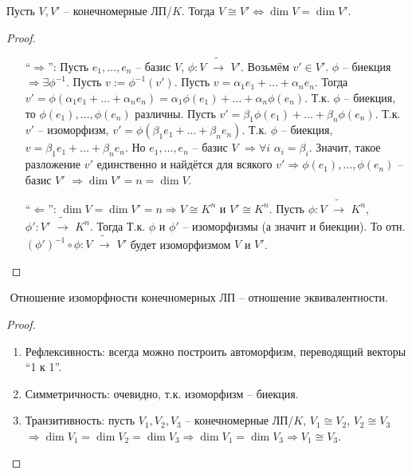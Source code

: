 \begin{theorem-nonna}
\end{theorem-nonna}
Пусть $V, V'$ -- конечномерные ЛП/$K$. Тогда $V \cong V'
\Leftrightarrow \dim V = \dim V'$.
\begin{proof} $ $

    \begin{itemize}
        \item[``$\Longrightarrow$'':] 
        Пусть $e_1, \dots, e_n$ -- базис $V$,
        $\phi : V \,\, \widetilde{\to} \,\, V'$.
        Возьмём $v' \in V'$. $\phi$ -- биекция $\Rightarrow
        \exists \phi^{-1}$. Пусть $v := \phi^{-1}(v')$.
        Пусть $v = \alpha_1 e_1 + \dots + \alpha_n e_n$.
        Тогда $v' = \phi(\alpha_1 e_1 + \dots + \alpha_n e_n) =
        \alpha_1 \phi(e_1) + \dots + \alpha_n \phi(e_n)$.
        Т.к. $\phi$ -- биекция, то $\phi(e_1), \dots, \phi(e_n)$
        различны. 
        Пусть $v' = \beta_1 \phi(e_1) + \dots + \beta_n \phi(e_n)$.
        Т.к. $v'$ -- изоморфизм, $v' = \phi(\beta_1 e_1 + 
        \dots + \beta_n e_n)$. Т.к. $\phi$ -- биекция,
        $v = \beta_1 e_1 + \dots + \beta_n e_n$.
        Но $e_1, \dots, e_n$ -- базис $V$
        $\Rightarrow \forall i \,\, \alpha_i = \beta_i$. Значит,
        такое разложение $v'$ единственно и найдётся для всякого
        $v' \Rightarrow \phi(e_1), \dots, \phi(e_n)$ -- базис $V'$
        $\Rightarrow \dim V' = n = \dim V$.

        \item[``$\Longleftarrow$'':]
        $\dim V = \dim V' = n \Rightarrow V \cong K^n$ и $V' \cong K^n$.
        Пусть $\phi : V \,\, \widetilde{\to} \,\, K^n$,
        $\phi' : V' \,\, \widetilde{\to} \,\, K^n$. Тогда
        Т.к. $\phi$ и $\phi'$ -- изоморфизмы (а значит и биекции).
        То отн. $(\phi')^{-1} \circ \phi : V \,\, \widetilde{\to} \,\, V'$
        будет изоморфизмом $V$ и $V'$.
    \end{itemize}
\end{proof}

\follow $ $ Отношение изоморфности конечномерных ЛП -- 
отношение эквивалентности.
\begin{proof} $ $

    \begin{enumerate}
        \item Рефлексивность: всегда можно построить автоморфизм,
        переводящий векторы ``1 к 1''.
        \item Симметричность: очевидно, т.к. изоморфизм -- биекция.
        \item Транзитивность: пусть $V_1, V_2, V_3$ -- конечномерные ЛП/$K$,
        $V_1 \cong V_2$, $V_2 \cong V_3$ $\Rightarrow \dim V_1 = \dim V_2
        = \dim V_3 \Rightarrow \dim V_1 = \dim V_3 \Rightarrow V_1 \cong V_3$.
        
    \end{enumerate}
\end{proof}